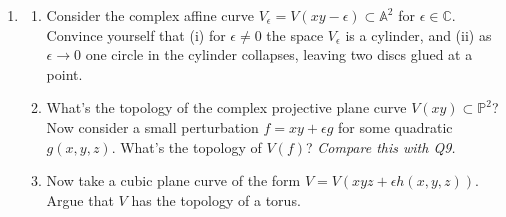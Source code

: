 \documentclass{article}
\theoremstyle{definition}
\renewcommand{\P}{\mathbb{P}}
\newcommand{\A}{\mathbb{A}}
\newcommand{\C}{\mathbb{C}}
\begin{document}
\begin{enumerate}
\begin{proof}[Solution]
\begin{enumerate}[label=(\alph*)]
                    Different quadratic forms correspond to different special
                    matrix forms as in (b), for example
                    \begin{equation*}
                        x^2 + y^2 = \det\begin{pmatrix}
                            x & -y \\
                            y & x
                        \end{pmatrix}
                    \end{equation*}
                    and
                    \begin{equation*}
                        xw - yz = \det\begin{pmatrix}
                            x & y \\ z & w
                        \end{pmatrix}.
                    \end{equation*}
                    The latter gives the Segre embedding
                    $\P^1\times\P^1\to\P^3$,
                    $(X_1:X_2,Y_1:Y_2)\mapsto(X_1Y_1:X_1Y_2:X_2Y_1:X_2Y_2)$,
                    whose image is $V(XW-YZ)$.
            \end{enumerate}
        \end{proof}

    \item
        \begin{enumerate}[label=(\alph*)]
            \item Consider the complex affine curve
                $V_\epsilon=V(xy-\epsilon)\subset\A^2$ for $\epsilon\in\C$.
                Convince yourself that (i) for $\epsilon\ne0$ the space
                $V_\epsilon$ is a cylinder, and (ii) as $\epsilon\to0$ one
                circle in the cylinder collapses, leaving two discs glued at a
                point.

            \item What's the topology of the complex projective plane curve
                $V(xy)\subset\P^2$? Now consider a small perturbation
                $f=xy+\epsilon g$ for some quadratic $g(x,y,z)$. What's the
                topology of $V(f)$? \emph{Compare this with Q9.}

            \item Now take a cubic plane curve of the form
                $V=V(xyz+\epsilon h(x,y,z))$. Argue that $V$ has the topology of
                a torus.
        \end{enumerate}


\end{enumerate}
\end{document}
